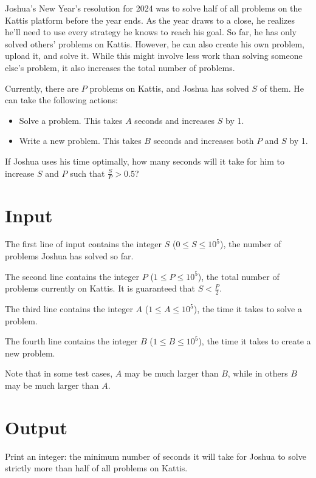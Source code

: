
Joshua's New Year's resolution for 2024 was to solve half of all problems on the Kattis platform before the year ends.
As the year draws to a close, he realizes he'll need to use every strategy he knows to reach his goal.
So far, he has only solved others' problems on Kattis. However, he can also create his own problem, upload it, and
solve it. While this might involve less work than solving someone else's problem, it also increases the total number
of problems.

Currently, there are $P$ problems on Kattis, and Joshua has solved $S$ of them. He can take the following actions:

\begin{itemize}
  \item Solve a problem. This takes $A$ seconds and increases $S$ by 1.
  \item Write a new problem. This takes $B$ seconds and increases both $P$ and $S$ by 1.
\end{itemize}

If Joshua uses his time optimally, how many seconds will it take for him to increase $S$ and $P$ such that 
$\frac{S}{P} > 0.5$?

\section*{Input}
The first line of input contains the integer $S$ ($0 \leq S \leq 10^5$), the number of problems Joshua has
solved so far.

The second line contains the integer $P$ ($1 \leq P \leq 10^5$), the total number of problems currently on Kattis. 
It is guaranteed that $S < \frac{P}{2}$.

The third line contains the integer $A$ ($1 \leq A \leq 10^5$), the time it takes to solve a problem.

The fourth line contains the integer $B$ ($1 \leq B \leq 10^5$), the time it takes to create a new problem.

Note that in some test cases, $A$ may be much larger than $B$, while in others $B$ may be much larger than $A$.

\section*{Output}
Print an integer: the minimum number of seconds it will take for Joshua to solve strictly more than half 
of all problems on Kattis.

